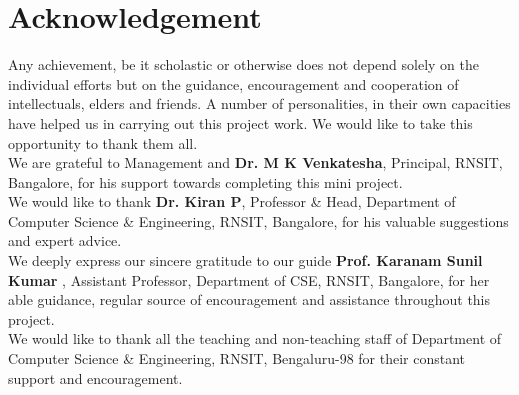 \chapter*{Acknowledgement}%
%

Any achievement, be it scholastic or otherwise does not depend solely on the individual 
efforts but on the guidance, encouragement and cooperation of intellectuals, elders and 
friends. A number of personalities, in their own capacities have helped us in carrying out 
this project work. We would like to take this opportunity to thank them all.\\
We are grateful to Management and \textbf{Dr. M K Venkatesha}, Principal, RNSIT, Bangalore, for his 
support towards completing this mini project.\\
We would like to thank \textbf{Dr. Kiran P}, Professor \& Head, Department of Computer 
Science \& Engineering, RNSIT, Bangalore, for his valuable suggestions and expert advice.\\
We deeply express our sincere gratitude to our guide \textbf{Prof. Karanam Sunil Kumar }, Assistant 
Professor, Department of CSE, RNSIT, Bangalore, for her able guidance, regular source of 
encouragement and assistance throughout this project. \\
We would like to thank all the teaching and non-teaching staff of Department of 
Computer Science \& Engineering, RNSIT, Bengaluru-98 for their constant support and encouragement.

\thispagestyle{plain}
